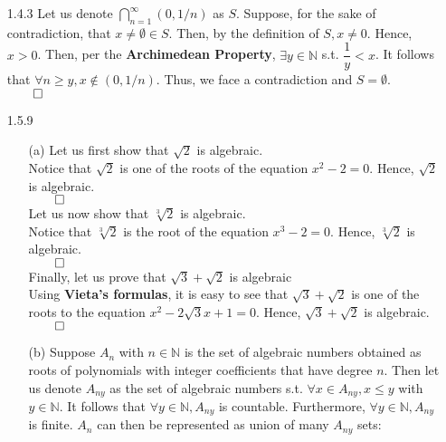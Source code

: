 \documentclass[11pt]{article}
\newcommand{\nats}{\mathbb{N}}
\begin{document}
\begin{itemize}
    \item[1.4.3]
        Let us denote $\bigcap_{n = 1}^{\infty} (0, 1/n)$ as $S$. Suppose, for
        the sake of contradiction, that $x \neq \emptyset \in S$. Then, by the
        definition of $S, x \neq 0$. Hence, $x > 0$. Then, per the
        \textbf{Archimedean Property}, $\exists y \in \nats$ s.t.
        $\dfrac{1}{y} < x$. It follows that $\forall n \geq y, x \notin
        (0, 1/n)$. Thus, we face a contradiction and $S = \emptyset$.\\
        $\qed$
        
    \item[1.5.9]
        \begin{itemize}
            \item[(a)]
                Let us first show that $\sqrt{2}$ is algebraic.\\
                Notice that $\sqrt{2}$ is one of the roots of the equation $x^2
                - 2 = 0$. Hence, $\sqrt{2}$ is algebraic.\\
                $\qed$
                \\
                Let us now show that $\sqrt[3]{2}$ is algebraic.\\
                Notice that $\sqrt[3]{2}$ is the root of the equation $x^3 - 2
                = 0$. Hence, $\sqrt[3]{2}$ is algebraic.\\
                $\qed$
                \\
                Finally, let us prove that $\sqrt{3} + \sqrt{2}$ is algebraic
                \\
                Using \textbf{Vieta's formulas}, it is easy to see that
                $\sqrt{3} + \sqrt{2}$ is one of the roots to the equation $x^2
                -2\sqrt{3}x + 1 = 0$. Hence, $\sqrt{3} + \sqrt{2}$ is
                algebraic.\\
                $\qed$

            \item[(b)]
                Suppose $A_n$ with $n \in \nats$ is the set of algebraic
                numbers obtained as roots of polynomials with integer
                coefficients that have degree $n$. Then let us denote $A_{ny}$
                as the set of algebraic numbers s.t. $\forall x \in A_{ny},
                x \leq y$ with $y \in \nats$. It follows that $\forall y \in
                \nats, A_{ny}$ is countable. Furthermore, $\forall y \in \nats,
                A_{ny}$ is finite. $A_n$ can then be represented as union of
                many $A_{ny}$ sets:


\end{itemize}
\end{itemize}
\end{document}
